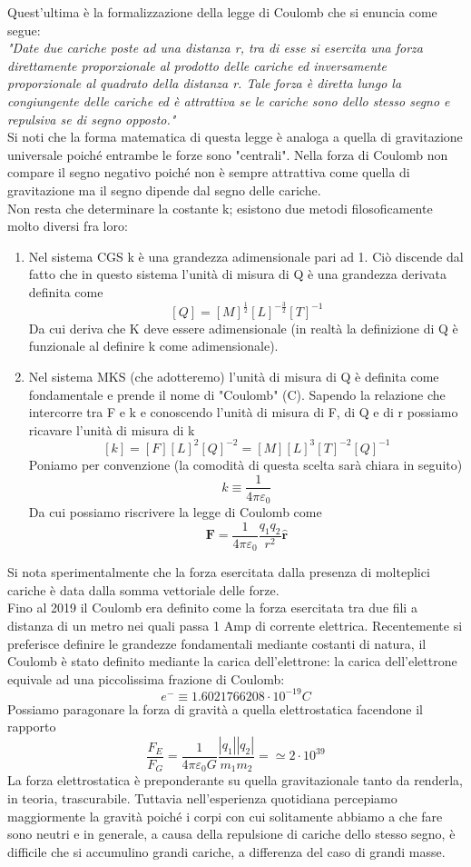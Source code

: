 \documentclass[10pt,a4paper]{article}
\begin{document}
Quest'ultima è la formalizzazione della legge di Coulomb che si enuncia come segue:\\
\textit{"Date due cariche poste ad una distanza r, tra di esse si esercita una forza direttamente proporzionale al prodotto delle cariche ed inversamente proporzionale al quadrato della distanza r. Tale forza è diretta lungo la congiungente delle cariche ed è attrattiva se le cariche sono dello stesso segno e repulsiva se di segno opposto."}\\
Si noti che la forma matematica di questa legge è analoga a quella di gravitazione universale poiché entrambe le forze sono "centrali". Nella forza di Coulomb non compare il segno negativo poiché non è sempre attrattiva come quella di gravitazione ma il segno dipende dal segno delle cariche.\\
Non resta che determinare la costante k; esistono due metodi filosoficamente molto diversi fra loro:
\begin{enumerate}
	\item Nel sistema CGS  k è una grandezza adimensionale pari ad 1. Ciò discende dal fatto che in questo sistema l'unità di misura di Q è una grandezza derivata definita come
	\[[Q] = [M]^{\frac{1}{2}}[L]^{-\frac{3}{2}}[T]^{-1}\]
	Da cui deriva che K deve essere adimensionale (in realtà la definizione di Q è funzionale al definire k come adimensionale).
	\item Nel sistema MKS (che adotteremo) l'unità di misura di Q è definita come fondamentale e prende il nome di "Coulomb" (C). Sapendo la relazione che intercorre tra F e k e conoscendo l'unità di misura di F, di Q e di r possiamo ricavare l'unità di misura di k
	\[[k] = [F][L]^2[Q]^{-2} = [M][L]^3[T]^{-2}[Q]^{-1}\]
	Poniamo per convenzione (la comodità di questa scelta sarà chiara in seguito)
	\[k \equiv \frac{1}{4\pi\varepsilon_0}\]
	Da cui possiamo riscrivere la legge di Coulomb come
	\[\mathbf{F} = \frac{1}{4\pi\varepsilon_0}\frac{q_1q_2}{r^2}\hat{\mathbf{r}}\]
\end{enumerate}
Si nota sperimentalmente che la forza esercitata dalla presenza di molteplici cariche è data dalla somma vettoriale delle forze.\\
Fino al 2019 il Coulomb era definito come la forza esercitata tra due fili a distanza di un metro nei quali passa 1 Amp di corrente elettrica. Recentemente si preferisce definire le grandezze fondamentali mediante costanti di natura, il Coulomb è stato definito mediante la carica dell'elettrone: la carica dell'elettrone equivale ad una piccolissima frazione di Coulomb: 
\[e^- \equiv 1.6021766208\cdot10^{-19} C\]
Possiamo paragonare la forza di gravità a quella elettrostatica facendone il rapporto
\[\frac{F_E}{F_G} = \frac{1}{4\pi\varepsilon_0 G}\frac{|q_1||q_2|}{m_1m_2}=\simeq 2\cdot10^{39}\]
La forza elettrostatica è preponderante su quella gravitazionale tanto da renderla, in teoria, trascurabile. Tuttavia nell'esperienza quotidiana percepiamo maggiormente la gravità poiché i corpi con cui solitamente abbiamo a che fare sono neutri e in generale, a causa della repulsione di cariche dello stesso segno, è difficile che si accumulino grandi cariche, a differenza del caso di grandi masse.
\end{document}
